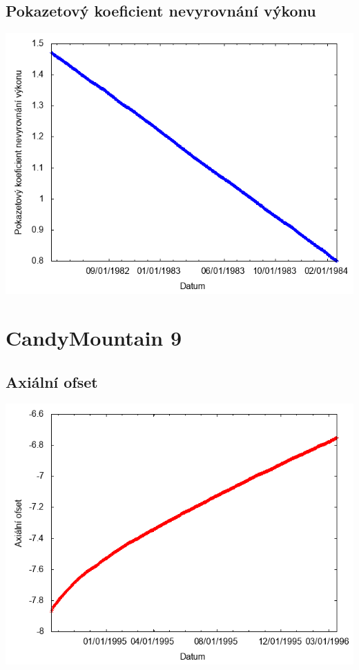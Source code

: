 \documentclass[a4paper,twoside,11pt]{article}
\begin{document}
\subsection*{Pokazetový koeficient nevyrovnání výkonu}
\begin{center}
\includegraphics[width=.8\textwidth]{graphs/CandyMountain_08_fha.png}
\end{center}

\newpage
\section*{CandyMountain 9}
\subsection*{Axiální ofset}
\begin{center}
\includegraphics[width=.8\textwidth]{graphs/CandyMountain_09_ao.png}
\end{center}
\end{document}
